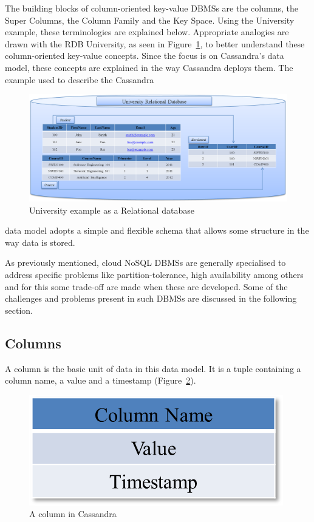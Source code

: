 The building blocks of column-oriented key-value \acp{DBMS} are the columns,  
the Super Columns,   the Column Family and the Key Space.  Using the
University example,   these terminologies are explained below. 
Appropriate analogies are drawn with the \ac{RDB} University,   as
seen in Figure~\ref{f:RDB}, to better understand these column-oriented key-value
concepts.  Since the focus is on Cassandra's  data model,   these concepts
are explained in the way Cassandra deploys them.  The example used
to describe the Cassandra  

\begin{landscape}
\begin{figure}[c]
	\centering
	\includegraphics[width=1.4\textwidth]{./figure/Example/Relational-DB.png}
	\caption{University example as a Relational database}\label{f:RDB}
\end{figure}
\end{landscape}

\noindent data model adopts a simple and flexible schema that
allows some structure in the way data is stored. 

As previously mentioned,  cloud \ac{NoSQL}
\acp{DBMS} are generally specialised to address specific problems like
partition-tolerance,  high availability among others and for this some trade-off
are made when these are developed.
Some of the challenges and problems present in such \acp{DBMS} are discussed in
the following section.

\subsection{Columns}
A column is the basic unit of data in this data model.  It is a
tuple containing a column name,   a value and a timestamp (Figure~\ref{f:column}). 

\begin{figure}[h]
	\centering
	\includegraphics[width=.3\textwidth]{./figure/Example/Column.png}
	\caption{A column in Cassandra}\label{f:column}
\end{figure}

